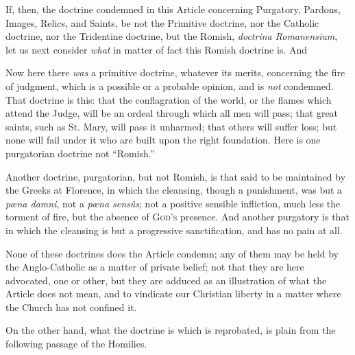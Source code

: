 If, then, the doctrine condemned in this Article concerning
Purgatory, Pardons, Images, Relics, and Saints, be not the Primitive
doctrine, nor the Catholic doctrine, nor the Tridentine doctrine, but
the Romish, \emph{doctrina Romanensium}, let us next consider \emph{what} in
matter of fact this Romish doctrine is. And


Now here there \emph{was} a primitive doctrine, whatever its
merits, concerning the fire of judgment, which is a possible or a
probable opinion, and is \emph{not} condemned. That doctrine is this:
that the conflagration of the world, or the flames which attend the
Judge, will be an ordeal through which all men will pass; that great
saints, such as St. Mary, will pass it unharmed; that others will
suffer loss; but none will fail under it who are built upon the right
foundation. Here is one purgatorian doctrine not ``Romish.''

Another doctrine, purgatorian, but not Romish, is that said to be
maintained by the Greeks at Florence, in which the cleansing, though a
punishment, was but a \emph{pœna damni}, not a \emph{pœna sensûs};
not a positive sensible infliction, much less the torment of fire, but
the absence of G\textsc{od's} presence. And another
purgatory is that in which the cleansing is but a progressive
sanctification, and has no pain at all.

None of these doctrines does the Article condemn; any of them may
be held by the Anglo-Catholic as a matter of private belief; not that
they are here advocated, one or other, but they are adduced as an
illustration of what the Article does not mean, and to vindicate our
Christian liberty in a matter where the Church has not confined it.

On the other hand, what the doctrine is which is reprobated, is
plain from the following passage of the Homilies.

